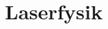 \documentclass[crop=false, class=memoir]{standalone}
\begin{document}
\chapter{Laserfysik} \label{chap:laser_opg}
\end{document}

